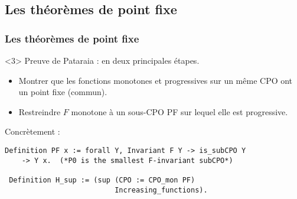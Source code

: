 \documentclass{beamer}
\newcommand\code[1]{{\fontfamily{lmtt}\selectfont #1}}
\begin{document}
\subsection{Les théorèmes de point fixe}
\begin{frame}[fragile]
\frametitle{Les théorèmes de point fixe}



\begin{onlyenv}<3>
Preuve de Pataraia : en deux principales étapes.
\begin{itemize}
\item Montrer que les fonctions monotones et progressives sur un même CPO ont un point fixe (commun).
\item Restreindre $F$ monotone à un sous-CPO \code{PF} sur lequel elle est progressive.
\end{itemize}

\medskip

Concrètement :

\begin{lstlisting}[frame=single, language = Coq, basicstyle=\scriptsize]
 Definition PF x := forall Y, Invariant F Y -> is_subCPO Y 
 	-> Y x.  (*P0 is the smallest F-invariant subCPO*)
 
 Definition H_sup := (sup (CPO := CPO_mon PF) 
                          Increasing_functions).
                          

\end{lstlisting}
\end{onlyenv}
\end{frame}
\end{document}
